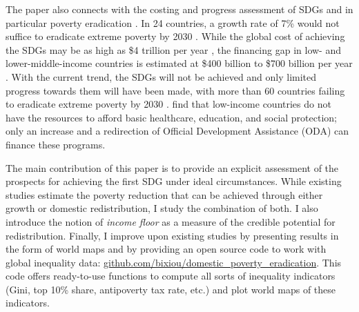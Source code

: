 The paper also connects with the costing and progress assessment of SDGs and in particular poverty eradication \citep{schmidt-traub_investment_2015,rozenberg_beyond_2019,sdsn_sdg_2019,manuel_financing_2020,vorisek_understanding_2020,unctad_estimating_2021,un_sustainable_2022}. In 24 countries, a growth rate of 7\% would not suffice to eradicate extreme poverty by 2030 \citep{unctad_estimating_2021}. While the global cost of achieving the SDGs may be as high as \$4 trillion per year \citep{unctad_world_2023}, %
the financing gap in low- and lower-middle-income countries is estimated at \$400 billion \citep{sdsn_sdg_2019} %
to \$700 billion per year \citep{kharas_building_2019}. %
With the current trend, the SDGs will not be achieved and only limited progress towards them will have been made, with more than 60 countries failing to eradicate extreme poverty by 2030 \citep{moyer_are_2020}. %
\cite{manuel_financing_2018} find that low-income countries do not have the resources to afford basic healthcare, education, and social protection; only an increase and a redirection of Official Development Assistance (ODA) can finance these programs. 

The main contribution of this paper is to provide an explicit assessment of the prospects for achieving the first SDG under ideal circumstances. While existing studies estimate the poverty reduction that can be achieved through either growth or domestic redistribution, I study the combination of both. I also introduce the notion of \textit{income floor} as a measure of the credible potential for redistribution. Finally, I improve upon existing studies by presenting results in the form of world maps and by providing an open source code to work with global inequality data: \href{https://github.com/bixiou/domestic_poverty_eradication}{github.com/bixiou/domestic\_poverty\_eradication}. This code offers ready-to-use functions to compute all sorts of inequality indicators (Gini, top 10\% share, antipoverty tax rate, etc.) and plot world maps of these indicators.

